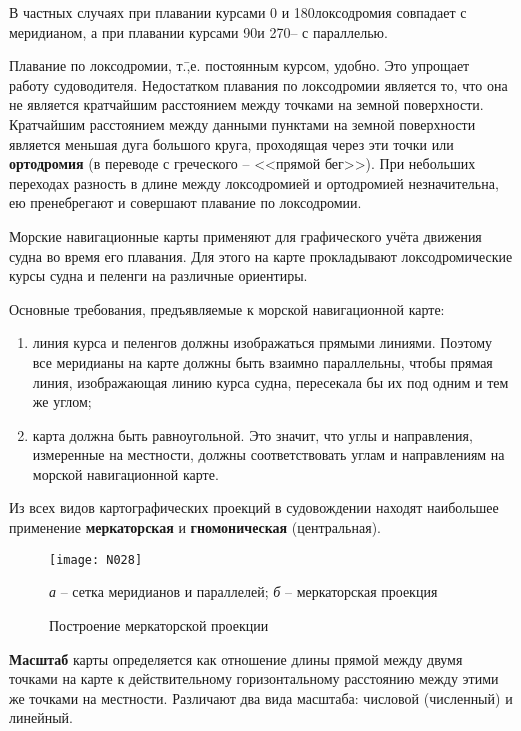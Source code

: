 В частных случаях при плавании курсами 0 и 180\gr локсодромия
совпадает с меридианом, а при плавании курсами 90\gr и 270\gr \--- с
параллелью.

Плавание по локсодромии, т.\=,е. постоянным курсом, удобно. Это
упрощает работу судоводителя. Недостатком плавания по локсодромии
является то, что она не является кратчайшим расстоянием между точками
на земной поверхности. Кратчайшим расстоянием между данными пунктами
на земной поверхности является меньшая дуга большого круга, проходящая
через эти точки или \textbf{ортодромия} (в переводе
с греческого \--- <<прямой бег>>). При небольших переходах разность в
длине между локсодромией и ортодромией незначительна, ею пренебрегают
и совершают плавание по локсодромии.

Морские навигационные карты применяют для графического учёта движения
судна во время его плавания. Для этого на карте прокладывают
локсодромические курсы судна и пеленги на различные ориентиры.

Основные требования, предъявляемые к морской навигационной карте: 

\begin{enumerate}
\item линия курса и пеленгов должны изображаться прямыми
  линиями. Поэтому все меридианы на карте должны быть взаимно
  параллельны, чтобы прямая линия, изображающая линию курса судна,
  пересекала бы их под одним и тем же углом;
\item карта должна быть равноугольной. Это значит, что углы и
  направления, измеренные на местности, должны соответствовать углам и
  направлениям на морской навигационной карте.
\end{enumerate}

Из всех видов картографических проекций в судовождении находят
наибольшее применение \textbf{меркаторская}
и \textbf{гномоническая} (центральная).

\begin{figure*}[htb]
  \centering{}
  \texttt{[image: N028]}
  \caption{Построение меркаторской проекции}
  \label{fig:N28}
  \small
  \centering{}
  \textit{а} \--- сетка меридианов и параллелей; \textit{б} \--- меркаторская проекция
\end{figure*}

\textbf{Масштаб} карты определяется как отношение длины прямой между двумя точками на карте к действительному горизонтальному расстоянию между этими же точками на местности. Различают два вида масштаба: числовой (численный) и линейный.
 
